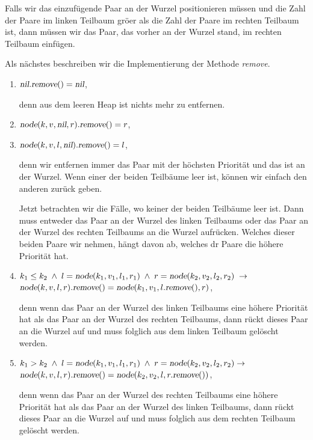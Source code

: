 \begin{enumerate}
      Falls wir das einzuf\"ugende Paar an der Wurzel
      positionieren m\"ussen und die Zahl der Paare im linken Teilbaum
      gr\"o\3er als die Zahl der Paare im rechten Teilbaum ist,
      dann m\"ussen wir das Paar, das vorher an der Wurzel stand, im rechten Teilbaum
      einf\"ugen.
\end{enumerate}
Als n\"achstes beschreiben wir die Implementierung der Methode \textsl{remove}.
\begin{enumerate}
\item $\textsl{nil}.\textsl{remove}() = \textsl{nil}$,

      denn aus dem leeren Heap ist nichts mehr zu entfernen.
\item $\textsl{node}(k,v,\textsl{nil},r).\textsl{remove}() = r$,
  
\item $\textsl{node}(k,v,l,\textsl{nil}).\textsl{remove}() = l$,

      denn wir entfernen immer das Paar mit der h\"ochsten Priorit\"at und das ist an der
      Wurzel.  Wenn einer der beiden Teilb\"aume leer ist, k\"onnen wir einfach den anderen
      zur\"uck geben.

      Jetzt betrachten wir die F\"alle, wo keiner der beiden Teilb\"aume leer ist.
      Dann muss entweder das Paar an der Wurzel des linken Teilbaums
      oder das Paar an der Wurzel des rechten Teilbaums an die Wurzel aufr\"ucken.
      Welches dieser beiden Paare wir nehmen, h\"angt davon ab, welches dr Paare die h\"ohere
      Priorit\"at hat.
\item $k_1 \leq k_2 \;\wedge\; l = \textsl{node}(k_1,v_1,l_1,r_1) \;\wedge\; r =
      \textsl{node}(k_2,v_2,l_2,r_2) \;\rightarrow$ \\[0.1cm] 
      \hspace*{1.3cm} 
      $\textsl{node}(k,v,l,r).\textsl{remove}() =      \textsl{node}(k_1,v_1,l.\textsl{remove}(),r)$,

      denn wenn das Paar an der Wurzel des linken Teilbaums eine h\"ohere Priorit\"at hat
      als das Paar an der Wurzel des rechten Teilbaums, dann r\"uckt dieses Paar an
      die Wurzel auf und muss folglich aus dem linken Teilbaum gel\"oscht werden.
\item $k_1 > k_2 \;\wedge\; l = \textsl{node}(k_1,v_1,l_1,r_1) \;\wedge\; r = \textsl{node}(k_2,v_2,l_2,r_2) \rightarrow$ \\[0.1cm]
      \hspace*{1.3cm} 
      $\textsl{node}(k,v,l,r).\textsl{remove}() = \textsl{node}(k_2,v_2,l,r.\textsl{remove}())$,

      denn wenn das Paar an der Wurzel des rechten Teilbaums eine h\"ohere Priorit\"at hat
      als das Paar an der Wurzel des linken Teilbaums, dann r\"uckt dieses Paar an
      die Wurzel auf und muss folglich aus dem rechten Teilbaum gel\"oscht werden.  
\end{enumerate}
